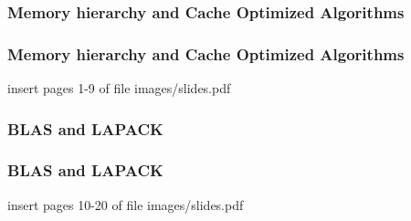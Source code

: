 \documentclass[smaller,a4paper,allowframebreaks]{beamer}
\begin{document}
%
%
%


\begin{frame}
\frametitle{Memory hierarchy and Cache Optimized Algorithms}
\end{frame}

\begin{frame}
\frametitle{Memory hierarchy and Cache Optimized Algorithms}
insert pages 1-9 of file images/slides.pdf
\end{frame}

\begin{frame}
\frametitle{BLAS and LAPACK}
\end{frame}

\begin{frame}
\frametitle{BLAS and LAPACK}
insert pages 10-20 of file images/slides.pdf
\end{frame}
\end{document}
